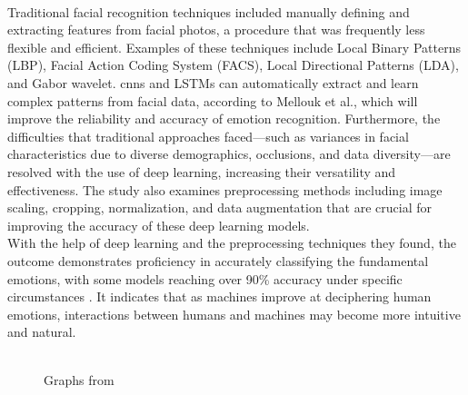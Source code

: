 \\
\indent Traditional facial recognition techniques included manually defining and extracting features from facial photos, a procedure that was frequently less flexible and efficient. 
Examples of these techniques include Local Binary Patterns (LBP), Facial Action Coding System (FACS), Local Directional Patterns (LDA), and Gabor wavelet. 
\gls{cnns} and LSTMs can automatically extract and learn complex patterns from facial data, according to Mellouk et al., which will improve the reliability and accuracy of emotion recognition. 
Furthermore, the difficulties that traditional approaches faced—such as variances in facial characteristics due to diverse demographics, occlusions, and data diversity—are resolved with the use of deep learning, increasing their versatility and effectiveness.
The study also examines preprocessing methods including image scaling, cropping, normalization, and data augmentation that are crucial for improving the accuracy of these deep learning models.
\\
\indent With the help of deep learning and the preprocessing techniques they found, the outcome demonstrates proficiency in accurately classifying the fundamental emotions, with some models reaching over 90\% accuracy under specific circumstances \citep{mellouk_2020_facial}. 
It indicates that as machines improve at deciphering human emotions, interactions between humans and machines may become more intuitive and natural.
\\
\begin{figure}[!ht]
    \centering
    \qquad
    \vspace{0.5cm}
    \\
    \scriptsize{Graphs from \citep{agrawal_2019_using}}
\end{figure}
